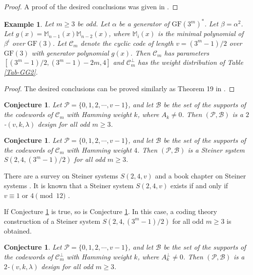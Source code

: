 \documentclass[1p,final]{elsarticle}
\newtheorem{example}{Example}
\newtheorem{conj}[theorem]{Conjecture}
\newcommand{\gf}{{\mathrm{GF}}}
\newcommand{\m}{\mathbb{M}}
\newcommand{\cP}{{\mathcal{P}}}
\newcommand{\cB}{{\mathcal{B}}}
\newcommand{\C}{{\mathcal{C}}}
\begin{document}
\begin{proof}
A proof of the desired conclusions was given in \cite{LDXG}. 
\end{proof}

\begin{example}\label{exam-j272}  
Let $m \geq 3$ be odd. Let $\alpha$ be a generator of $\gf(3^m)^*$. Let $\beta=\alpha^2$.
Let $g(x)=\m_{n-1}(x)\m_{n-2}(x)$, where $\m_i(x)$ is the minimal polynomial of $\beta^i$ over
$\gf(3)$. Let $\C_m$ denote the cyclic code of length $v=(3^m-1)/2$ over $\gf(3)$ with 
generator polynomial $g(x)$. Then $\C_m$ has parameters $[(3^m-1)/2, (3^m-1)-2m, 4]$ and 
$\C_m^\perp$ has the weight distribution of Table \ref{Tab-GG2}.  
\end{example}    

\begin{proof}
The desired conclusions can be proved similarly as Theorem 19 in \cite{LDXG}.  
\end{proof}

\begin{conj}\label{conj-j261}
Let $\cP=\{0,1,2, \cdots, v-1\}$, and let $\cB$ be  the set of the supports of the codewords of $\C_m$
with Hamming weight $k$, where $A_k \neq 0$. Then $(\cP, \cB)$
is a $2$-$(v, k, \lambda)$ design for all odd $m \ge 3$. 
\end{conj}


\begin{conj}\label{conj-j262}
Let $\cP=\{0,1,2, \cdots, v-1\}$, and let $\cB$ be  the set of the supports of the codewords of $\C_m$
with Hamming weight $4$. Then $(\cP, \cB)$
is a Steiner system $S(2, 4, (3^m-1)/2)$ for all odd $m \ge 3$. 
\end{conj}


There are a survey on Steiner systems $S(2,4,v)$ \cite{RR10} and a book chapter on Steiner 
systems \cite{CMhb}. It is known that a Steiner system $S(2,4,v)$ exists if and only if 
$v \equiv 1 \mbox{ or } 4 \pmod{12}$ \cite{Hanani}.  

If Conjecture \ref{conj-j261} is true, so is Conjecture \ref{conj-j262}. In this case, a 
coding theory construction of a Steiner system $S(2, 4, (3^m-1)/2)$ for all odd $m \ge 3$ 
is obtained. 


\begin{conj}\label{conj-j263}
Let $\cP=\{0,1,2, \cdots, v-1\}$, and let $\cB$ be  the set of the supports of the codewords of $\C_m^\perp$
with Hamming weight $k$, where $A_k^\perp \neq 0$. Then $(\cP, \cB)$
is a $2$-$(v, k, \lambda)$ design for all odd $m \ge 3$. 
\end{conj}
\end{document}
